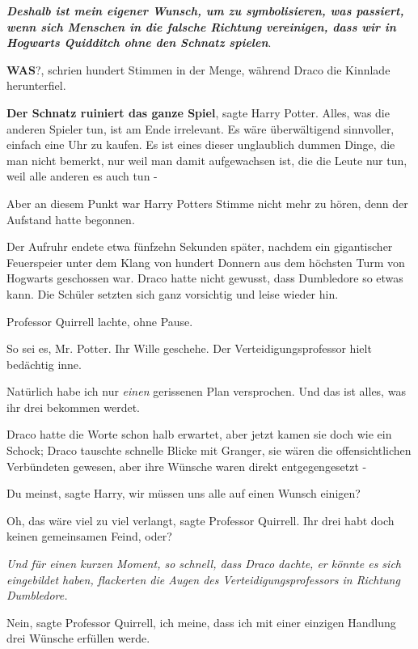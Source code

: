 \textbf{\emph{Deshalb ist mein eigener Wunsch, um zu symbolisieren, was
passiert, wenn sich Menschen in die falsche Richtung vereinigen, dass wir in
Hogwarts Quidditch ohne den Schnatz spielen}}.\grqq{}

\glqq{}\textbf{WAS}?\grqq{}, schrien hundert Stimmen in der Menge, während Draco
die Kinnlade herunterfiel.

\glqq{}\textbf{Der Schnatz ruiniert das ganze Spiel}\grqq{}, sagte Harry Potter.
\glqq{}Alles, was die anderen Spieler tun, ist am Ende irrelevant. Es wäre
überwältigend sinnvoller, einfach eine Uhr zu kaufen. Es ist eines dieser
unglaublich dummen Dinge, die man nicht bemerkt, nur weil man damit aufgewachsen
ist, die die Leute nur tun, weil alle anderen es auch tun -\grqq{}

Aber an diesem Punkt war Harry Potters Stimme nicht mehr zu hören, denn der
Aufstand hatte begonnen.

Der Aufruhr endete etwa fünfzehn Sekunden später, nachdem ein gigantischer
Feuerspeier unter dem Klang von hundert Donnern aus dem höchsten Turm von
Hogwarts geschossen war. Draco hatte nicht gewusst, dass Dumbledore so etwas
kann. Die Schüler setzten sich ganz vorsichtig und leise wieder hin.

Professor Quirrell lachte, ohne Pause.

\glqq{}So sei es, Mr. Potter. Ihr Wille geschehe.\grqq{} Der Verteidigungsprofessor
hielt bedächtig inne.

\glqq{}Natürlich habe ich nur \emph{einen} gerissenen Plan versprochen. Und das
ist alles, was ihr drei bekommen werdet.\grqq{}

Draco hatte die Worte schon halb erwartet, aber jetzt kamen sie doch wie ein
Schock; Draco tauschte schnelle Blicke mit Granger, sie wären die
offensichtlichen Verbündeten gewesen, aber ihre Wünsche waren direkt
entgegengesetzt -

\glqq{}Du meinst\grqq{}, sagte Harry, \glqq{}wir müssen uns alle auf einen Wunsch
einigen?\grqq{}

\glqq{}Oh, das wäre viel zu viel verlangt\grqq{}, sagte Professor Quirrell. \glqq{}
Ihr drei habt doch keinen gemeinsamen Feind, oder?\grqq{}

\emph{Und für einen kurzen Moment, so schnell, dass Draco dachte, er könnte es
sich eingebildet haben, flackerten die Augen des Verteidigungsprofessors in
Richtung Dumbledore.}

\glqq{}Nein\grqq{}, sagte Professor Quirrell, \glqq{}ich meine, dass ich mit einer
einzigen Handlung drei Wünsche erfüllen werde.\grqq{}

